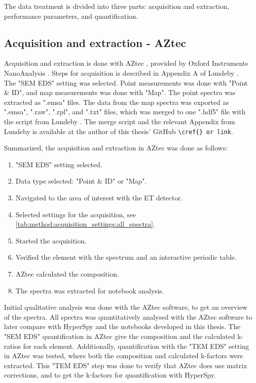 The data treatment is divided into three parts: acquisition and extraction, performance parameters, and quantification.

\subsection{Acquisition and extraction - AZtec}
\label{method:data_treatment:aztec}

Acquisition and extraction is done with AZtec , provided by Oxford Instruments NanoAnalysis \cite{aztec_manual}.
Steps for acquisition is described in Appendix A of Lundeby \cite{lundeby_improving_2019}.
The "SEM EDS" setting was selected.
Point measurements was done with "Point \& ID", and map measurements was done with "Map".
The point spectra was extracted as ".emsa" files.
The data from the map spectra was exported as ".emsa", ".raw", ".rpl", and ".txt" files, which was merged to one ".hdf5" file with the script from Lundeby \cite[A.3]{lundeby_improving_2019}.
The merge script and the relevant Appendix from Lundeby is available at the author of this thesis' GitHub \verb|\cref{} or link|.

Summarized, the acquisition and extraction in AZtec was done as follows:
\begin{enumerate}
    \item "SEM EDS" setting selected.
    \item Data type selected: "Point \& ID" or "Map".
    \item Navigated to the area of interest with the ET detector.
    \item Selected settings for the acquisition, see \cref{tab:method:acquisition_settings:all_spectra}.
    \item Started the acquisition.
    \item Verified the element with the spectrum and an interactive periodic table.
    \item AZtec calculated the composition.
    \item The spectra was extracted for notebook analysis.
\end{enumerate}


Initial qualitative analysis was done with the AZtec software, to get an overview of the spectra.
All spectra was quantitatively analysed with the AZtec software to later compare with HyperSpy and the notebooks developed in this thesis.
The "SEM EDS" quantification in AZtec give the composition and the calculated k-ratios for each element.
Additionally, quantification with the "TEM EDS" setting in AZtec was tested, where both the composition and calculated k-factors were extracted.
This "TEM EDS" step was done to verify that AZtec does use matrix corrections, and to get the k-factors for quantification with HyperSpy.



